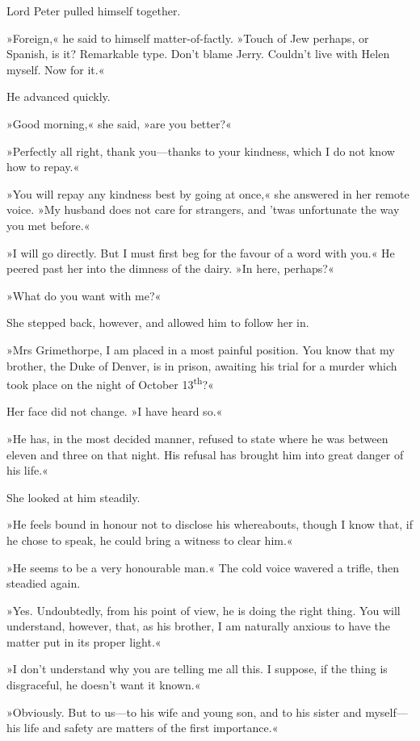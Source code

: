 Lord Peter pulled himself together.

»Foreign,« he said to himself matter-of-factly. »Touch of Jew perhaps, or Spanish, is it? Remarkable type. Don't blame Jerry. Couldn't live with Helen myself. Now for it.«

He advanced quickly.

»Good morning,« she said, »are you better?«

»Perfectly all right, thank you—thanks to your kindness, which I do not know how to repay.«

»You will repay any kindness best by going at once,« she answered in her remote voice. »My husband does not care for strangers, and 'twas unfortunate the way you met before.«

»I will go directly. But I must first beg for the favour of a word with you.« He peered past her into the dimness of the dairy. »In here, perhaps?«

»What do you want with me?«

She stepped back, however, and allowed him to follow her in.

»Mrs Grimethorpe, I am placed in a most painful position. You know that my brother, the Duke of Denver, is in prison, awaiting his trial for a murder which took place on the night of October 13\textsuperscript{th}?«

Her face did not change. »I have heard so.«

»He has, in the most decided manner, refused to state where he was between eleven and three on that night. His refusal has brought him into great danger of his life.«

She looked at him steadily.

»He feels bound in honour not to disclose his whereabouts, though I know that, if he chose to speak, he could bring a witness to clear him.«

»He seems to be a very honourable man.« The cold voice wavered a trifle, then steadied again.

»Yes. Undoubtedly, from his point of view, he is doing the right thing. You will understand, however, that, as his brother, I am naturally anxious to have the matter put in its proper light.«

»I don't understand why you are telling me all this. I suppose, if the thing is disgraceful, he doesn't want it known.«

»Obviously. But to us—to his wife and young son, and to his sister and myself—his life and safety are matters of the first importance.«

